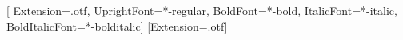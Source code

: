 
\providecommand{\CoverEnTitle}{C LANGUAGE}
\providecommand{\CoverEnSubtitle}{A Lazy Approach}
\providecommand{\CoverZhTitle}{教猫狗学编程}
\providecommand{\CoverAuthor}{whensungoesdown}
\providecommand{\CoverEdition}{First Edition}

\newfontfamily{}[
  Extension=.otf, UprightFont=*-regular, BoldFont=*-bold,
  ItalicFont=*-italic, BoldItalicFont=*-bolditalic]
[Extension=.otf]

